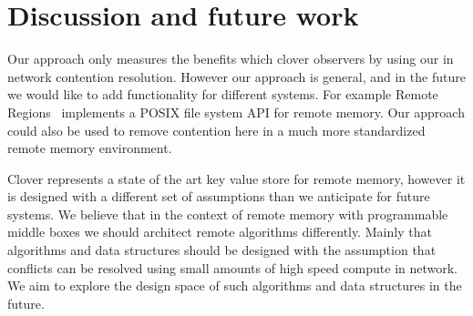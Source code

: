 \section{Discussion and future work}

Our approach only measures the benefits which clover observers by using our in
network contention resolution. However our approach is general, and in the
future we would like to add functionality for different systems. For example
Remote Regions~\cite{reigons} implements a POSIX file system API for remote
memory.  Our approach could also be used to remove contention here in a much
more standardized remote memory environment.

Clover represents a state of the art key value store for remote memory, however
it is designed with a different set of assumptions than we anticipate for future
systems. We believe that in the context of remote memory with programmable middle
boxes we should architect remote algorithms differently. Mainly that algorithms
and data structures should be designed with the assumption that conflicts can be
resolved using small amounts of high speed compute in network. We aim to explore
the design space of such algorithms and data structures in the future.